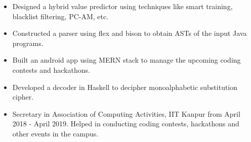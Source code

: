 {

\normalsize
\begin{itemize}
    \item Designed a hybrid value predictor using techniques like smart training, blacklist filtering, PC-AM, etc.
    \item Constructed a parser using flex and bison to obtain ASTs of the input Java programs.
    \item Built an android app using MERN stack to manage the upcoming coding contests and hackathons.
    \item Developed a decoder in Haskell to decipher monoalphabetic substitution cipher.
    \item Secretary in Association of Computing Activities, IIT Kanpur from April 2018 - April 2019. Helped in conducting coding contests, hackathons and other events in the campus.
\end{itemize}
}
